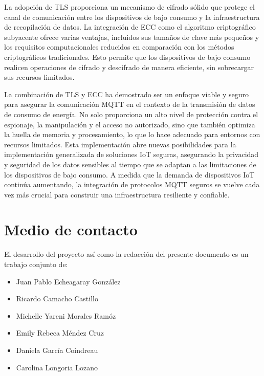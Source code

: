 \documentclass{article}
\begin{document}
        La adopción de TLS proporciona un mecanismo de cifrado sólido que protege el canal de comunicación entre los dispositivos de bajo consumo y la infraestructura de recopilación de datos. La integración de ECC como el algoritmo criptográfico subyacente ofrece varias ventajas, incluidos sus tamaños de clave más pequeños y los requisitos computacionales reducidos en comparación con los métodos criptográficos tradicionales. Esto permite que los dispositivos de bajo consumo realicen operaciones de cifrado y descifrado de manera eficiente, sin sobrecargar sus recursos limitados.

        La combinación de TLS y ECC ha demostrado ser un enfoque viable y seguro para asegurar la comunicación MQTT en el contexto de la transmisión de datos de consumo de energía. No solo proporciona un alto nivel de protección contra el espionaje, la manipulación y el acceso no autorizado, sino que también optimiza la huella de memoria y procesamiento, lo que lo hace adecuado para entornos con recursos limitados. Esta implementación abre nuevas posibilidades para la implementación generalizada de soluciones IoT seguras, asegurando la privacidad y seguridad de los datos sensibles al tiempo que se adaptan a las limitaciones de los dispositivos de bajo consumo. A medida que la demanda de dispositivos IoT continúa aumentando, la integración de protocolos MQTT seguros se vuelve cada vez más crucial para construir una infraestructura resiliente y confiable.

    \clearpage
    
    

    \clearpage
    \appendix
    \section{Medio de contacto}\label{sec:contact}

        El desarrollo del proyecto así como la redacción del presente documento es un trabajo conjunto de:
        \begin{itemize}[noitemsep]
            \item Juan Pablo Echeagaray González
            \item Ricardo Camacho Castillo
            \item Michelle Yareni Morales Ramóz
            \item Emily Rebeca Méndez Cruz
            \item Daniela García Coindreau
            \item Carolina Longoria Lozano
        \end{itemize}
\end{document}
